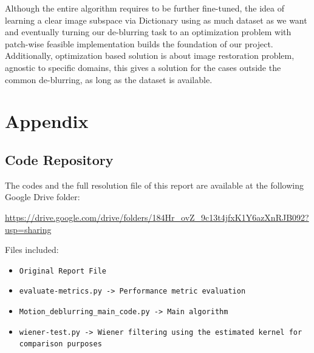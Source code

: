 \documentclass{article}
\theoremstyle{definition}
\begin{document}
Although the entire algorithm requires to be further fine-tuned, the idea of learning a clear image subspace via Dictionary using as much dataset as we want and eventually turning our de-blurring task to an optimization problem with patch-wise feasible implementation builds the foundation of our project. Additionally, optimization based solution is about image restoration problem, agnostic to specific domains, this gives a solution for the cases outside the common de-blurring, as long as the dataset is available. 



\newpage


\section{Appendix}

\subsection*{Code Repository}

The codes and the full resolution file of this report are available at the following Google Drive folder:
\begin{center}
\url{https://drive.google.com/drive/folders/184Hr_ovZ_9c13t4jfxK1Y6azXnRJB092?usp=sharing}
\end{center}

Files included:
\begin{itemize}
    \item \texttt{Original Report File}
  \item \texttt{evaluate-metrics.py -> Performance metric evaluation}
  \item \texttt{Motion\_deblurring\_main\_code.py  -> Main algorithm}
  \item \texttt{wiener-test.py -> Wiener filtering using the estimated kernel for comparison purposes}
\end{itemize}









\newpage
\end{document}
